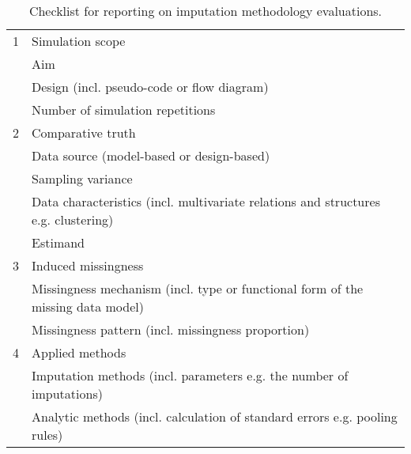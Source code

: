 \documentclass[bimj,fleqn]{w-art}
\begin{document}
\begin{table}[ht]
\caption{Checklist for reporting on imputation methodology evaluations.}
\label{table:check}
\begin{tabular}{ll}
\hline
1 & Simulation scope                                                                   \\ \cline{2-2}
  & Aim                                                                                \\
  & Design (incl. pseudo-code or flow diagram)                                         \\
  & Number of simulation repetitions                                                   \\ \hline
2 & Comparative truth                                                                  \\ \cline{2-2}
  & Data source (model-based or design-based)                                           \\
  & Sampling variance                                                                  \\
  & Data characteristics (incl. multivariate relations and structures e.g. clustering) \\
  & Estimand                                                                           \\ \hline 
3 & Induced missingness                                                                \\ \cline{2-2}
  & Missingness mechanism (incl. type or functional form of the missing data   model)  \\
  & Missingness pattern (incl. missingness proportion)                                 \\ \hline 
4 & Applied methods                                                                    \\ \cline{2-2}
  & Imputation methods (incl. parameters e.g. the number of imputations)               \\
  & Analytic methods (incl. calculation of standard errors e.g. pooling   rules)       \\

\end{tabular}
\end{table}
\end{document}
